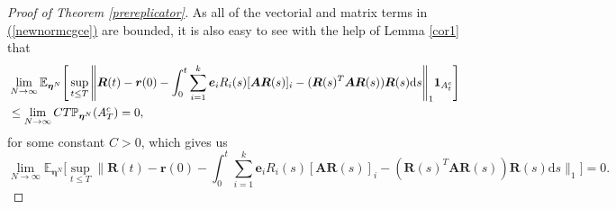 \documentclass[12pt, leqno]{article}
\renewcommand{\eqref}[1]{\hyperref[#1]{(\ref*{#1})}}
\newcommand{\dd}{{\mathrm d}}
\begin{document}
\begin{proof}[Proof of Theorem \ref{prereplicator}]
As all of the vectorial and matrix terms in \eqref{newnormcgce} are bounded, it is also easy to see with the help of Lemma \ref{cor1} that 
\begin{align*}
&\lim_{N\to\infty}\mathbb{E}_{\bm \eta^N}\Bigg[\sup_{t\leq T}\Bigg\|
{\bm R}(t) - {\bm r}(0)- \int_0^t \sum_{i=1}^k {\bm e}_iR_i(s) [\bm A\bm R(s)]_i  - (\bm R(s)^T\bm A\bm R(s)  )\bm R(s)  \dd s  \Bigg\|_1\mathbf{1}_{A_t^c}\Bigg]\notag\\
&\leq \lim_{N\to\infty}C T \mathbb{P}_{\bm \eta^N}(A_T^c)=0,
\end{align*}
for some constant $C>0$, which gives us 
\begin{equation}
\lim_{N\to\infty}\mathbb{E}_{\bm \eta^N}\Bigg[\sup_{t\leq T}\Bigg\|
{\bm R}(t) - {\bm r}(0)- \int_0^t \sum_{i=1}^k {\bm e}_iR_i(s) [\bm A\bm R(s)]_i  - (\bm R(s)^T\bm A\bm R(s)  )\bm R(s)  \dd s  \Bigg\|_1\Bigg]=0.
\label{newnormcgce2}
\end{equation}


\end{proof}
\end{document}

